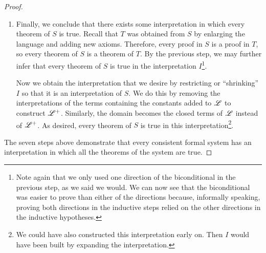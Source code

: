 \begin{proposition}
\begin{proof}
\begin{enumerate}
\begin{enumerate}
\begin{enumerate}
                  \Ra{} Suppose that \(\cua\), which is \((\forall x_i)\cub(x_i)\), is a theorem of \(T\). By (K4) and MP, \(\cub(x_i)\) must be a theorem of \(T\), and since it is a closed \wf{} with fewer than \(n\) connectives and quantifiers, by the induction hypothesis, it is true in \(I\). By Corollary 3.28, \((\forall x_i)\cub(x_i)\), which is \(\cua\), must be true in \(I\).

                  \La{} Suppose that \((\forall x_i)\cub(x_i)\) is true in \(I\). By Corollary 3.28, \(\cub(x_i)\) is true in \(I\). It is a closed \wf{} with fewer than \(n\) connectives and quantifiers, so by the induction hypothesis, \(\cub(x_i)\) is a theorem of \(T\). Its proof can be extended via Generalization to yield a proof of \((\forall x_i)\cub(x_i)\), which is \(\cua\), in \(T\), i.e. \(\cua\) is a theorem of \(T\).
              \end{enumerate}
          \end{enumerate}

        \item Finally, we conclude that there exists some interpretation in which every theorem of \(S\) is true. Recall that \(T\) was obtained from \(S\) by enlarging the language and adding new axioms. Therefore, every proof in \(S\) is a proof in \(T\), so every theorem of \(S\) is a theorem of \(T\). By the previous step, we may further infer that every theorem of \(S\) is true in the interpretation \(I\)\footnote{Note again that we only used one direction of the biconditional in the previous step, as we said we would. We can now see that the biconditional was easier to prove than either of the directions because, informally speaking, proving both directions in the inductive steps relied on the other directions in the inductive hypotheses.}.

          Now we obtain the interpretation that we desire by restricting or ``shrinking'' \(I\) so that it is an interpretation of \(S\). We do this by removing the interpretations of the terms containing the constants added to \(\mathscr{L}\) to construct \(\mathscr{L}^+\). Similarly, the domain becomes the closed terms of \(\mathscr{L}\) instead of \(\mathscr{L}^+\). As desired, every theorem of \(S\) is true in this interpretation\footnote{We could have also constructed this interpretation early on. Then \(I\) would have been built by expanding the interpretation.}.
      \end{enumerate}

      The seven steps above demonstrate that every consistent formal system has an interpretation in which all the theorems of the system are true.
    \end{proof}
  \end{proposition}

